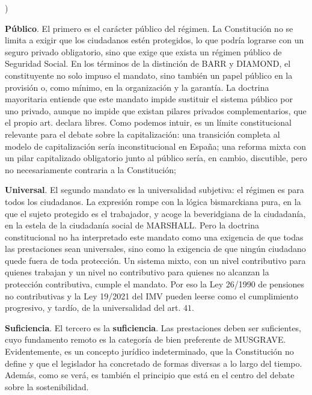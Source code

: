 \documentclass[10pt,a4paper]{article}
\newcounter{alphaitem}
\newenvironment{la}
      {\begin{list}{\alph{alphaitem})}{%
          \usecounter{alphaitem}%
          \setlength{\leftmargin}{1cm}%
          \setlength{\parskip}{3pt}%
          \setlength{\itemsep}{0pt}%
          \setlength{\parsep}{0pt}%
      }}
      {\end{list}}
\begin{document}
\begin{la}
    \item \textbf{Público}. El primero es el carácter público del régimen. La Constitución no se limita a exigir que los ciudadanos estén protegidos, lo que podría lograrse con un seguro privado obligatorio, sino que exige que exista un régimen público de Seguridad Social. En los términos de la distinción de BARR y DIAMOND, el constituyente no solo impuso el mandato, sino también un papel público en la provisión o, como mínimo, en la organización y la garantía. La doctrina mayoritaria entiende que este mandato impide sustituir el sistema público por uno privado, aunque no impide que existan pilares privados complementarios, que el propio art. declara libres. Como podemos intuir, es un límite constitucional relevante para el debate sobre la capitalización: una transición completa al modelo de capitalización sería inconstitucional en España; una reforma mixta con un pilar capitalizado obligatorio junto al público sería, en cambio, discutible, pero no necesariamente contraria a la Constitución;
    \item \textbf{Universal}. El segundo mandato es la universalidad subjetiva: el régimen es para todos los ciudadanos. La expresión rompe con la lógica bismarckiana pura, en la que el sujeto protegido es el trabajador, y acoge la beveridgiana de la ciudadanía, en la estela de la ciudadanía social de MARSHALL. Pero la doctrina constitucional no ha interpretado este mandato como una exigencia de que todas las prestaciones sean universales, sino como la exigencia de que ningún ciudadano quede fuera de toda protección. Un sistema mixto, con un nivel contributivo para quienes trabajan y un nivel no contributivo para quienes no alcanzan la protección contributiva, cumple el mandato. Por eso la Ley 26/1990 de pensiones no contributivas y la Ley 19/2021 del IMV pueden leerse como el cumplimiento progresivo, y tardío, de la universalidad del art. $41$.
    \item \textbf{Suficiencia}. El tercero es la \textbf{suficiencia}. Las prestaciones deben ser suficientes, cuyo fundamento remoto es la categoría de bien preferente de MUSGRAVE. Evidentemente, es un concepto jurídico indeterminado, que la Constitución no define y que el legislador ha concretado de formas diversas a lo largo del tiempo. Además, como se verá, es también el principio que está en el centro del debate sobre la sostenibilidad. 

\end{la}
\end{document}
